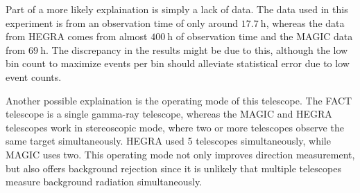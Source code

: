             Part of a more likely explaination is simply a lack of data.
            The data used in this experiment is from an observation time of only around $\SI{17.7}{\hour}$, whereas the data from HEGRA comes from almost $\SI{400}{\hour}$ of observation time and the MAGIC data from $\SI{69}{\hour}$.
            The discrepancy in the results might be due to this, although the low bin count to maximize events per bin should alleviate statistical error due to low event counts.

            Another possible explaination is the operating mode of this telescope.
            The FACT telescope is a single gamma-ray telescope, whereas the MAGIC and HEGRA telescopes work in stereoscopic mode, where two or more telescopes observe the same target simultaneously.
            HEGRA used 5 telescopes simultaneously, while MAGIC uses two.
            This operating mode not only improves direction measurement, but also offers background rejection since it is unlikely that multiple telescopes measure background radiation simultaneously.
            

\newpage
\printbibliography
\newpage

